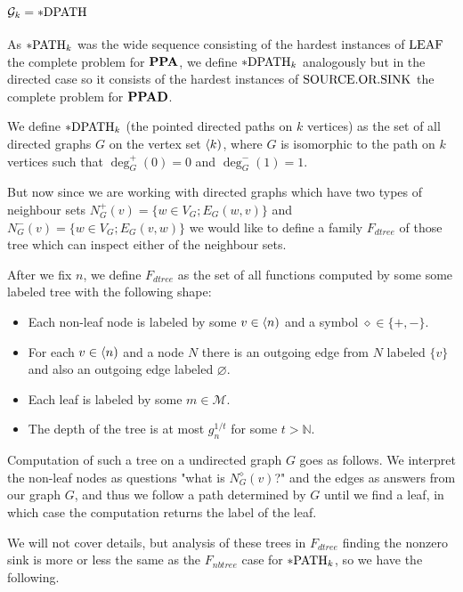 \section{$\mathcal{G}_k=*\text{DPATH}$}\label{secpDPATH}

As $*\text{PATH}_k$ was the wide sequence consisting of the hardest instances of $\text{LEAF}$ the complete problem for $\textbf{PPA}$, we define $*\text{DPATH}_k$ analogously but in the directed case so it consists of the hardest instances of $\text{SOURCE.OR.SINK}$ the complete problem for $\textbf{PPAD}$.


\begin{defi}
We define $*\text{DPATH}_k$ (the pointed directed paths on $k$ vertices) as the set of all directed graphs $G$ on the vertex set $\langle k)$, where $G$ is isomorphic to the path on $k$ vertices such that $\deg_G^{+}(0)=0$ and $\deg_G^{-}(1)=1$.
\end{defi}

But now since we are working with directed graphs which have two types of neighbour sets $N_G^+(v)=\{w\in V_G;E_G(w,v)\}$ and $N_G^-(v)=\{w\in V_G;E_G(v,w)\}$ we would like to define a family $F_{dtree}$ of those tree which can inspect either of the neighbour sets.

\begin{defi}
After we fix $n$, we define $F_{dtree}$ as the set of all functions computed by some some labeled tree with the following shape:

\begin{itemize}
\item Each non-leaf node is labeled by some $v\in\langle n)$ and a symbol $\diamond\in\{+,-\}$. 
\item For each $v \in \langle n)$ and a node $N$ there is an outgoing edge from $N$ labeled $\{v\}$ and also an outgoing edge labeled $\varnothing$.
\item Each leaf is labeled by some $m\in \mathcal{M}$.
\item The depth of the tree is at most $g_n^{1/t}$ for some $t>\mathbb{N}$.
\end{itemize}

Computation of such a tree on a undirected graph $G$ goes as follows. We interpret the non-leaf nodes as questions "what is $N_G^\diamond(v)$?" and the edges as answers from our graph $G$, and thus we follow a path determined by $G$ until we find a leaf, in which case the computation returns the label of the leaf.
\end{defi}

We will not cover details, but analysis of these trees in $F_{dtree}$ finding the nonzero sink is more or less the same as the $F_{nbtree}$ case for $*\text{PATH}_k$, so we have the following.

